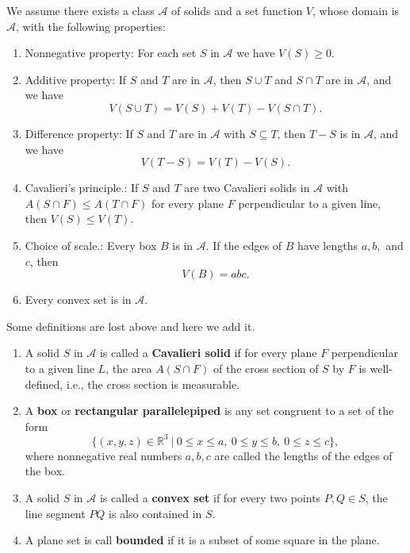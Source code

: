 	\begin{definitionenv}
		We assume there exists a class $\mathcal{A}$ of solids and a set function $V$, whose domain is $\mathcal{A}$, with the following properties:
		\begin{enumerate}
			\item Nonnegative property: For each set $S$ in $\mathcal{A}$ we have $V(S) \ge 0$.
			
			\item Additive property: If $S$ and $T$ are in $\mathcal{A}$, then 
			$S \cup T$ and $S \cap T$ are in $\mathcal{A}$, and we have
			\[
				V(S \cup T) = V(S) + V(T) - V(S \cap T).
			\]
			
			\item Difference property: If $S$ and $T$ are in $\mathcal{A}$ with $S \subseteq T$, 
			then $T - S$ is in $\mathcal{A}$, and we have 
			\[
				V(T - S) = V(T) - V(S).
			\]
			
			\item Cavalieri's principle.: If $S$ and $T$ are two Cavalieri solids in $\mathcal{A}$ 
			with $A(S \cap F) \le A(T \cap F)$ for every plane $F$ perpendicular to a given line, 
			then $V(S) \le V(T)$.
			
			\item Choice of scale.: Every box $B$ is in $\mathcal{A}$. 
			If the edges of $B$ have lengths $a, b,$ and $c$, then 
			\[
				V(B) = abc.
			\]
			
			\item Every convex set is in $\mathcal{A}$.
		\end{enumerate}
	\end{definitionenv}
	\begin{definitionenv}[Additional]
		Some definitions are lost above and here we add it.
		\begin{enumerate}
			\item A solid $S$ in $\mathcal{A}$ is called a \textbf{Cavalieri solid} if for every plane $F$ perpendicular to a given line $L$, the area $A(S\cap F)$ of the cross section of $S$ by $F$ is well-defined, i.e., the cross section is measurable.
			\item A \textbf{box} or \textbf{rectangular parallelepiped} is any set congruent to a set of the form
			\[
			\{(x,y,z)\in \mathbb{R}^3\ |\ 0\le x \le a,\ 0\le y \le b,\ 0\le z \le c \},
			\]
			where nonnegative real numbers $a,b,c$ are called the lengths of the edges of the box.
			\item A solid $S$ in $\mathcal{A}$ is called a \textbf{convex set} if for every two points $P,Q\in S$, the line segment $PQ$ is also contained in $S$.
			\item A plane set is call \textbf{bounded} if it is a subset of some square in the plane.
		\end{enumerate}
	\end{definitionenv}
